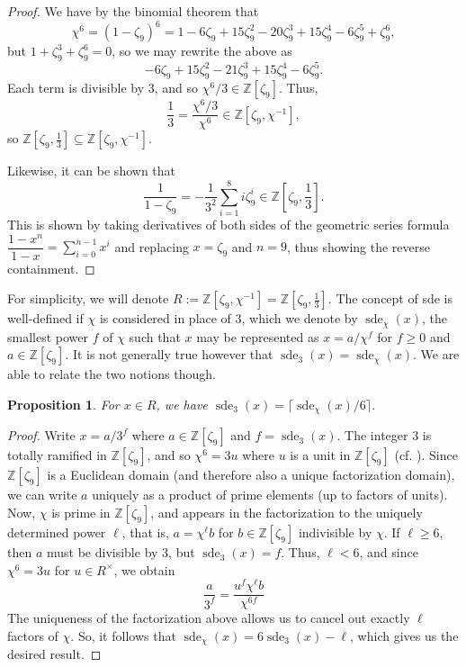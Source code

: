 \documentclass[12pt]{amsart}
\newtheorem{proposition}[theorem]{Proposition}
\theoremstyle{definition}
\newcommand{\Zn}{\mathbb{Z}[\zeta_9]}
\newcommand{\Znc}{\mathbb{Z}[\zeta_9,\chi^{-1}]}
\newcommand{\Znt}{\mathbb{Z}[\zeta_9,\frac{1}{3}]}
\DeclareMathOperator{\sde}{sde}
\begin{document}
	\begin{proof}
		We have by the binomial theorem that
		$$
			\chi^6 = (1 - \zeta_9)^6 = 1 - 6\zeta_9 + 15\zeta_9^2 - 20\zeta_9^3 + 15\zeta_9^4 - 6\zeta_9^5 + \zeta_9^6,
		$$
		but $1 + \zeta_9^3 + \zeta_9^6 = 0$, so we may rewrite the above as
		$$
		- 6\zeta_9 + 15\zeta_9^2 - 21\zeta_9^3 + 15\zeta_9^4 - 6\zeta_9^5.
		$$
		Each term is divisible by 3, and so $\chi^6/3 \in \Zn$. Thus,
		$$
		\frac{1}{3} = \dfrac{\chi^6/3}{\chi^6} \in \Znc,
		$$
		so $\Znt \subseteq \Znc$.
			
		Likewise, it can be shown that
		$$
		\dfrac{1}{1 - \zeta_9} = -\frac{1}{3^2}\sum_{i=1}^8 i\zeta_9^i \in \Znt.
		$$
		This is shown by taking derivatives of both sides of the geometric series formula $\dfrac{1 - x^{n}}{1-x} = \sum_{i=0}^{n-1} x^i$ and replacing $x = \zeta_9$ and $n = 9$, thus showing the reverse containment.
	\end{proof}
	
	For simplicity, we will denote $R := \Znc = \Znt$. The concept of sde is well-defined if $\chi$ is considered in place of $3$, which we denote by $\sde_\chi(x)$, the smallest power $f$ of $\chi$ such that $x$ may be represented as $x = a/\chi^f$ for $f \geq 0$ and $a \in \Zn$. It is not generally true however that $\sde_3(x) = \sde_\chi(x)$. We are able to relate the two notions though.
	\begin{proposition}\label{P:2:2}
		For $x \in R$, we have $\sde_3(x) = \lceil \sde_\chi(x)/6 \rceil$.
	\end{proposition}
	
	\begin{proof}
		Write $x = a/3^f$ where $a \in \Zn$ and $f = \sde_3(x)$. The integer 3 is totally ramified in $\Zn$, and so $\chi^6 = 3u$ where $u$ is a unit in $\Zn$ (cf. \cite[Theorem IV.1.1]{Lang}). Since $\Zn$ is a Euclidean domain (and therefore also a unique factorization domain), we can write $a$ uniquely as a product of prime elements (up to factors of units). Now, $\chi$ is prime in $\Zn$, and appears in the factorization to the uniquely determined power $\ell$, that is, $a = \chi^\ell b$ for $b \in \Zn$ indivisible by $\chi$. If $\ell \geq 6$, then $a$ must be divisible by $3$, but $\sde_3(x) = f$. Thus, $\ell < 6$, and since $\chi^6 = 3u$ for $u \in R^{\times}$, we obtain 
		$$
		\dfrac{a}{3^f} = \dfrac{u^f\chi^\ell b }{\chi^{6f}}
		$$
		The uniqueness of the factorization above allows us to cancel out exactly $\ell$ factors of $\chi$. So, it follows that $\sde_\chi(x) = 6\sde_3(x) - \ell$, which gives us the desired result.
	\end{proof}
\end{document}
